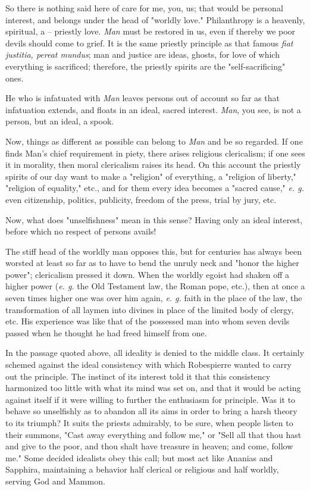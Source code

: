 \documentclass[a4paper]{book}
\begin{document}
So there is nothing said here of care for me, you, us; that would be personal 
interest, and belongs under the head of "{}worldly love."{} Philanthropy is a 
heavenly, spiritual, a -- priestly love. \textit{Man} must be restored in us, 
even if thereby we poor devils should come to grief. It is the same priestly 
principle as that famous \textit{fiat justitia, pereat mundus}; man and 
justice are ideas, ghosts, for love of which everything is sacrificed; 
therefore, the priestly spirits are the "{}self-sacrificing"{} ones.

He who is infatuated with \textit{Man} leaves persons out of account so far as 
that infatuation extends, and floats in an ideal, sacred interest. 
\textit{Man}, you see, is not a person, but an ideal, a spook.

Now, things as different as possible can belong to \textit{Man} and be so 
regarded. If one finds Man's chief requirement in piety, there arises 
religious clericalism; if one sees it in morality, then moral clericalism 
raises its head. On this account the priestly spirits of our day want to make 
a "{}religion"{} of everything, a "{}religion of liberty,"{} "{}religion of 
equality,"{} etc., and for them every idea becomes a "{}sacred cause,"{} 
\textit{e. g.} even citizenship, politics, publicity, freedom of the press, 
trial by jury, etc.

Now, what does "{}unselfishness"{} mean in this sense? Having only an ideal 
interest, before which no respect of persons avails!

The stiff head of the worldly man opposes this, but for centuries has always 
been worsted at least so far as to have to bend the unruly neck and "{}honor 
the higher power"{}; clericalism pressed it down. When the worldly egoist had 
shaken off a higher power (\textit{e. g.} the Old Testament law, the Roman 
pope, etc.), then at once a seven times higher one was over him again, 
\textit{e. g.} faith in the place of the law, the transformation of all laymen 
into divines in place of the limited body of clergy, etc. His experience was 
like that of the possessed man into whom seven devils passed when he thought 
he had freed himself from one.

In the passage quoted above, all ideality is denied to the middle class. It 
certainly schemed against the ideal consistency with which Robespierre wanted 
to carry out the principle. The instinct of its interest told it that this 
consistency harmonized too little with what its mind was set on, and that it 
would be acting against itself if it were willing to further the enthusiasm 
for principle. Was it to behave so unselfishly as to abandon all its aims in 
order to bring a harsh theory to its triumph? It suits the priests admirably, 
to be sure, when people listen to their summons, "{}Cast away everything and 
follow me,"{} or "{}Sell all that thou hast and give to the poor, and thou 
shalt have treasure in heaven; and come, follow me."{} Some decided idealists 
obey this call; but most act like Ananias and Sapphira, maintaining a behavior 
half clerical or religious and half worldly, serving God and Mammon.
\end{document}
